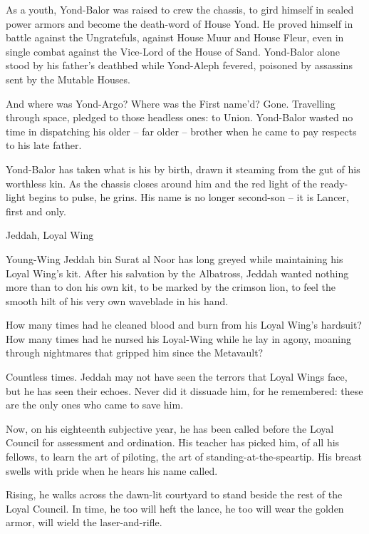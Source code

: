                                                                                                            


As a youth, Yond-Balor was raised to crew the chassis, to gird himself in sealed power armors  
and become the death-word of House Yond. He proved himself in battle against the Ungratefuls,  
against House Muur and House Fleur, even in single combat against the Vice-Lord of the House  
of Sand. Yond-Balor alone stood by his father’s deathbed while Yond-Aleph fevered, poisoned by  
assassins sent by the Mutable Houses.   

And where was Yond-Argo? Where was the First name’d? Gone. Travelling through space,  
pledged to those headless ones: to Union. Yond-Balor wasted no time in dispatching his older --  
far older -- brother when he came to pay respects to his late father.    

Yond-Balor has taken what is his by birth, drawn it steaming from the gut of his worthless kin. As  
the chassis closes around him and the red light of the ready-light begins to pulse, he grins. His  
name is no longer second-son -- it is Lancer, first and only.   

Jeddah, Loyal Wing   

Young-Wing Jeddah bin Surat al Noor has long greyed while maintaining his Loyal Wing’s kit.  
After his salvation by the Albatross, Jeddah wanted nothing more than to don his own kit, to be  
marked by the crimson lion, to feel the smooth hilt of his very own waveblade in his hand.   

How many times had he cleaned blood and burn from his Loyal Wing’s hardsuit? How many times  
had he nursed his Loyal-Wing while he lay in agony, moaning through nightmares that gripped  
him since the Metavault?   

Countless times. Jeddah may not have seen the terrors that Loyal Wings face, but he has seen  
their echoes. Never did it dissuade him, for he remembered: these are the only ones who came to  
save him.   

Now, on his eighteenth subjective year, he has been called before the Loyal Council for  
assessment and ordination. His teacher has picked him, of all his fellows, to learn the art of  
piloting, the art of standing-at-the-speartip. His breast swells with pride when he hears his name  
called.   

Rising, he walks across the dawn-lit courtyard to stand beside the rest of the Loyal Council. In  
time, he too will heft the lance, he too will wear the golden armor, will wield the laser-and-rifle.   

